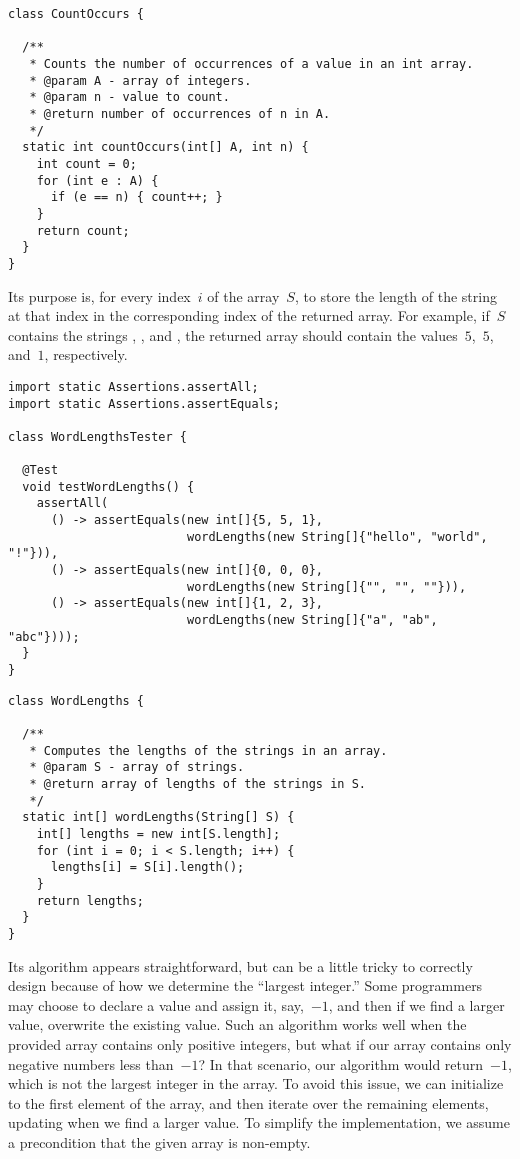 \begin{lstlisting}[language=MyJava]
class CountOccurs {

  /** 
   * Counts the number of occurrences of a value in an int array.
   * @param A - array of integers.
   * @param n - value to count.
   * @return number of occurrences of n in A.
   */
  static int countOccurs(int[] A, int n) {
    int count = 0;
    for (int e : A) {
      if (e == n) { count++; }
    }
    return count;
  }
}
\end{lstlisting}

Its purpose is, for every index~$i$ of the array~$S$, to store the length of the string at that index in the corresponding index of the returned array.
For example, if~$S$ contains the strings , , and , the returned array should contain the values~$5$,~$5$, and~$1$, respectively.

\enlargethispage{2\baselineskip}
\begin{lstlisting}[language=MyJava]
import static Assertions.assertAll;
import static Assertions.assertEquals;

class WordLengthsTester {

  @Test
  void testWordLengths() {
    assertAll(
      () -> assertEquals(new int[]{5, 5, 1}, 
                         wordLengths(new String[]{"hello", "world", "!"})),
      () -> assertEquals(new int[]{0, 0, 0}, 
                         wordLengths(new String[]{"", "", ""})),
      () -> assertEquals(new int[]{1, 2, 3}, 
                         wordLengths(new String[]{"a", "ab", "abc"})));
  }
}
\end{lstlisting}

\begin{lstlisting}[language=MyJava]
class WordLengths {

  /**
   * Computes the lengths of the strings in an array.
   * @param S - array of strings.
   * @return array of lengths of the strings in S.
   */
  static int[] wordLengths(String[] S) {
    int[] lengths = new int[S.length];
    for (int i = 0; i < S.length; i++) {
      lengths[i] = S[i].length();
    }
    return lengths;
  }
}
\end{lstlisting}

Its algorithm appears straightforward, but can be a little tricky to correctly design because of how we determine the ``largest integer.'' 
Some programmers may choose to declare a value  and assign it, say,~$-1$, and then if we find a larger value, overwrite the existing value. 
Such an algorithm works well when the provided array contains only positive integers, but what if our array contains only negative numbers less than~$-1$? 
In that scenario, our algorithm would return~$-1$, which is not the largest integer in the array. 
To avoid this issue, we can initialize  to the first element of the array, and then iterate over the remaining elements, updating  when we find a larger value.
To simplify the implementation, we assume a precondition that the given array is non-empty.

